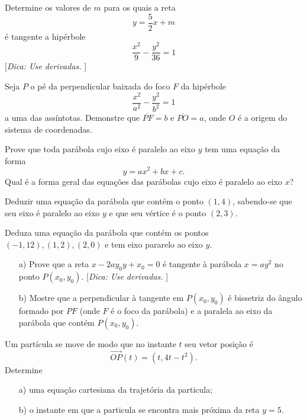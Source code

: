  
 \item
 Determine os valores de $m$ para os quais a reta
$$y=\frac{5}{2}x+m$$
\'e tangente a hipérbole
$$\frac{x^2}{9}-\frac{y^2}{36}=1
$$
[\textit{Dica: Use derivadas. }] 
% 
\item
 Seja $P$ o pé da perpendicular baixada do foco $F$ da hipérbole
$$\frac{x^2}{a^2}-\frac{y^2}{b^2}=1$$
a uma das assíntotas. Demonstre que $\overline{PF} = b$ e $\overline{PO} =a$, onde $O$ é a origem do sistema de coordenadas.
 

\item
 Prove que toda parábola cujo eixo \'e paralelo ao eixo $y$ tem uma equação da forma
$$y=ax^2+bx+c.$$
Qual é a forma geral das equações das parábolas cujo eixo é paralelo ao eixo $x$?
 

\item
 Deduzir uma equação da parábola que contém o ponto $(1, 4)$, sabendo-se que seu eixo é paralelo ao eixo $y$ e que seu v\'ertice é o ponto $(2,3)$.
 
% 
\item
 Deduza uma equação da parábola que contém os pontos $(-1,12), (1,2),(2,0)$ 
e tem eixo pararelo ao eixo $y$.
 
% 

 

\item
   \begin{enumerate}[leftmargin=*]
  \item[a)] Prove que a reta $x-2ay_0y+x_0=0$ \'e tangente à parábola $x= ay^2$ no ponto $P(x_0,y_0)$. [\textit{Dica: Use derivadas. }] 
  \item[b)] Mostre que a perpendicular \`a tangente em $P(x_0,y_0)$ \'e bissetriz do \^angulo formado por $PF$ (onde $F$ é o foco da parábola) e a paralela ao eixo da parábola que contém $P(x_0,y_0)$.
  \end{enumerate}
 

% 

 

\item
 Um part\'icula se move de modo que no instante $t$ seu vetor posi\c{c}\~ao \'e
 $$\vec{OP}(t)=(t,4t-t^2).$$
 Determine
  \begin{enumerate}[leftmargin=*]
  \item[a)] uma equa\c{c}\~ao cartesiana da trajet\'oria da particula;
  \item[b)] o instante em que a particula se encontra mais pr\'oxima da reta $y=5$.
  \end{enumerate}

